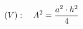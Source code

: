 \documentclass[preview]{standalone}
\begin{document}
\begin{align*}
\special{dvisvgm:raw <g id='unique000'>}(V):\quad A^2 = \frac{a^2 \cdot h^2}{4}\special{dvisvgm:raw </g>}
\end{align*}
\end{document}
